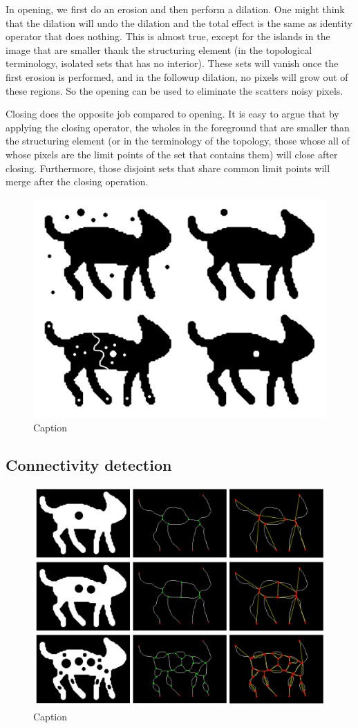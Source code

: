 \documentclass[11pt,a4paper]{article}
\theoremstyle{definition}
\theoremstyle{remark}
\begin{document}
	In opening, we first do an erosion and then perform a dilation. One might think that the dilation will undo the dilation and the total effect is the same as identity operator that does nothing. This is almost true, except for the islands in the image that are smaller thank the structuring element (in the topological terminology, isolated sets that has no interior). These sets will vanish once the first erosion is performed, and in the followup dilation, no pixels will grow out of these regions. So the opening can be used to eliminate the scatters noisy pixels. 
	
	Closing does the opposite job compared to opening. It is easy to argue that by applying the closing operator, the wholes in the foreground that are smaller than the structuring element (or in the terminology of the topology, those whose all of whose pixels are the limit points of the set that contains them) will close after closing. Furthermore, those disjoint sets that share common limit points will merge after the closing operation.
	
	\begin{figure}[h!]
		\centering
		\includegraphics[width=0.6\linewidth]{images/openingAndClosing.png}
		\caption{Caption}
		\label{fig:enter-label}
	\end{figure}
	
	
	\FloatBarrier
	\subsection*{Connectivity detection}
	
	\begin{figure}[h!]
		\centering
		\includegraphics[width=0.8\linewidth]{images/catWithHolesMontage.png}
		\caption{Caption}
		\label{fig:enter-label}
	\end{figure}
	
	
	
	
	
	
\end{document}
